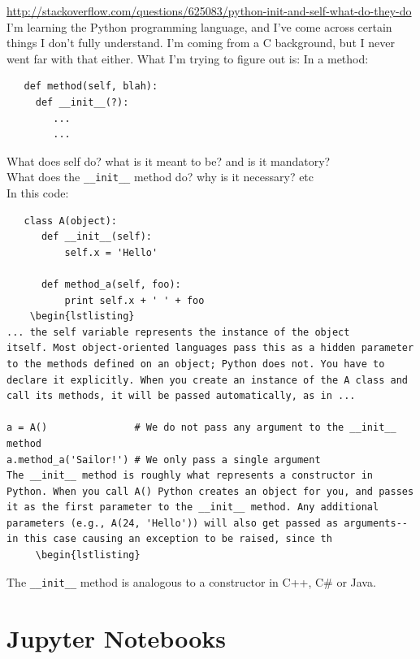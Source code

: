 \documentclass[11pt,a4paper]{article}
\begin{document}
    \href{http://stackoverflow.com/questions/625083/python-init-and-self-what-do-they-do}{http://stackoverflow.com/questions/625083/python-init-and-self-what-do-they-do}\\
   I'm learning the Python programming language, and I've come across
    certain things I don't fully understand. I'm coming from a C
    background, but I never went far with that either.
    What I'm trying to figure out is:
    In a method:
    \begin{lstlisting}
   def method(self, blah):
     def __init__(?):
        ...
        ...
  \end{lstlisting}
    What does self do? what is it meant to be? and is it mandatory?\\
    What does the {\tt \_\_init\_\_} method do? why is it necessary? etc\\

    
    In this code:
    \begin{lstlisting}
   class A(object):
      def __init__(self):
          self.x = 'Hello'

      def method_a(self, foo):
          print self.x + ' ' + foo
    \begin{lstlisting}
... the self variable represents the instance of the object
itself. Most object-oriented languages pass this as a hidden parameter
to the methods defined on an object; Python does not. You have to
declare it explicitly. When you create an instance of the A class and
call its methods, it will be passed automatically, as in ...

a = A()               # We do not pass any argument to the __init__ method
a.method_a('Sailor!') # We only pass a single argument
The __init__ method is roughly what represents a constructor in Python. When you call A() Python creates an object for you, and passes it as the first parameter to the __init__ method. Any additional parameters (e.g., A(24, 'Hello')) will also get passed as arguments--in this case causing an exception to be raised, since th
     \begin{lstlisting}
  \end{lstlisting}


The {\tt \_\_init\_\_} method is analogous to a constructor in C++, C\#
or Java.



\newpage
\section{Jupyter Notebooks}
\end{document}
